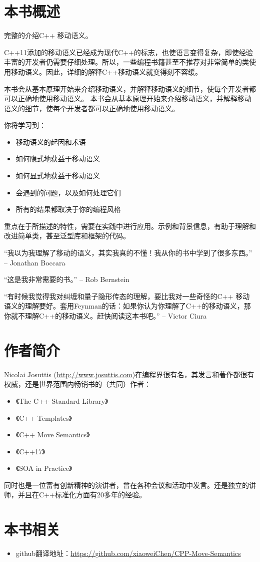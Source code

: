 
\section*{本书概述}

完整的介绍C++ 移动语义。

C++11添加的移动语义已经成为现代C++的标志，也使语言变得复杂，即使经验丰富的开发者仍需要仔细处理。所以，一些编程书籍甚至不推荐对非常简单的类使用移动语义。因此，详细的解释C++移动语义就变得刻不容缓。

本书会从基本原理开始来介绍移动语义，并解释移动语义的细节，使每个开发者都可以正确地使用移动语义。
本书会从基本原理开始来介绍移动语义，并解释移动语义的细节，使每个开发者都可以正确地使用移动语义。

你将学习到：

\begin{itemize}
    \item 移动语义的起因和术语
    \item 如何隐式地获益于移动语义
    \item 如何显式地获益于移动语义
    \item 会遇到的问题，以及如何处理它们
    \item 所有的结果都取决于你的编程风格
\end{itemize}

重点在于所描述的特性，需要在实践中进行应用。示例和背景信息，有助于理解和改进简单类，甚至泛型库和框架的代码。

“我以为我理解了移动的语义，其实我真的不懂！我从你的书中学到了很多东西。”	-- Jonathan Boccara

“这是我非常需要的书。” -- Rob Bernstein

“有时候我觉得我对纠缠和量子隐形传态的理解，要比我对一些奇怪的C++ 移动语义的理解要好。套用Feynman的话：如果你认为你理解了C++的移动语义，那你就不理解C++的移动语义。赶快阅读这本书吧。”	-- Victor Ciura


\section*{作者简介}
Nicolai Josuttis (\url{http://www.josuttis.com})在编程界很有名，其发言和著作都很有权威，还是世界范围内畅销书的（共同）作者：

\begin{itemize}
    \item 《The C++ Standard Library》
    \item 《C++ Templates》
    \item 《C++ Move Semantics》
    \item 《C++17》
    \item 《SOA in Practice》
\end{itemize}

同时也是一位富有创新精神的演讲者，曾在各种会议和活动中发言。还是独立的讲师，并且在C++标准化方面有20多年的经验。

\section*{本书相关}
\begin{itemize}
    \item github翻译地址：\url{https://github.com/xiaoweiChen/CPP-Move-Semantics}
\end{itemize}